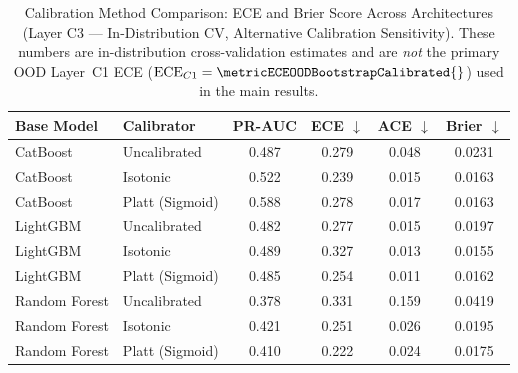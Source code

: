 \begin{table}[htbp]
\centering
\caption[Calibration Method Comparison]{Calibration Method Comparison: ECE and Brier Score Across Architectures (Layer C3 --- In-Distribution CV, Alternative Calibration Sensitivity). These numbers are in-distribution cross-validation estimates and are \textit{not} the primary OOD Layer~C1 ECE ($\text{ECE}_{C1} = \metricECEOODBootstrapCalibrated{}$) used in the main results.}
\label{tab:calibration_benchmark}
\renewcommand{\arraystretch}{1.2}
\begin{tabular}{llcccc}
\toprule
\textbf{Base Model} & \textbf{Calibrator} & \textbf{PR-AUC} & \textbf{ECE $\downarrow$} & \textbf{ACE $\downarrow$} & \textbf{Brier $\downarrow$} \\
\midrule
CatBoost & Uncalibrated & 0.487 & 0.279 & 0.048 & 0.0231 \\
CatBoost & Isotonic & 0.522 & 0.239 & 0.015 & 0.0163 \\
CatBoost & Platt (Sigmoid) & 0.588 & 0.278 & 0.017 & 0.0163 \\
LightGBM & Uncalibrated & 0.482 & 0.277 & 0.015 & 0.0197 \\
LightGBM & Isotonic & 0.489 & 0.327 & 0.013 & 0.0155 \\
LightGBM & Platt (Sigmoid) & 0.485 & 0.254 & 0.011 & 0.0162 \\
Random Forest & Uncalibrated & 0.378 & 0.331 & 0.159 & 0.0419 \\
Random Forest & Isotonic & 0.421 & 0.251 & 0.026 & 0.0195 \\
Random Forest & Platt (Sigmoid) & 0.410 & 0.222 & 0.024 & 0.0175 \\
\bottomrule
\end{tabular}
\end{table}
